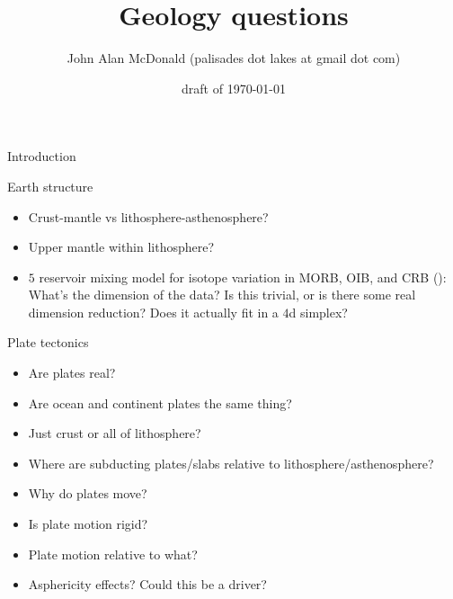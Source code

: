 \documentclass[12pt]{PalisadesLakesBook}
\title{Geology questions}
\author{John Alan McDonald 
(palisades dot lakes at gmail dot com)}
\date{draft of \today}
\begin{document}
\maketitle
{}
\begin{plSection}{Introduction}
\end{plSection}%
\begin{plSection}{Earth structure}
  \begin{itemize}
    \item Crust-mantle vs lithosphere-asthenosphere?
    \item Upper mantle within lithosphere?
    \item
    $5$ reservoir mixing model for isotope variation in MORB, OIB, and  CRB
    ():
    What's the dimension of the data?
    Is this trivial, or is there some real dimension reduction?
    Does it actually fit in a $4$d simplex?
  \end{itemize}
\end{plSection}%
\begin{plSection}{Plate tectonics}
  \begin{itemize}
    \item Are plates real?
    \item Are ocean and continent plates the same thing?
    \item Just crust or all of lithosphere?
    \item Where are subducting plates/slabs relative to lithosphere/asthenosphere?
    \item Why do plates move?
    \item Is plate motion rigid?
    \item Plate motion relative to what?
    \item Asphericity effects? Could this be a driver?
  \end{itemize}
\end{plSection}%
\end{document}
